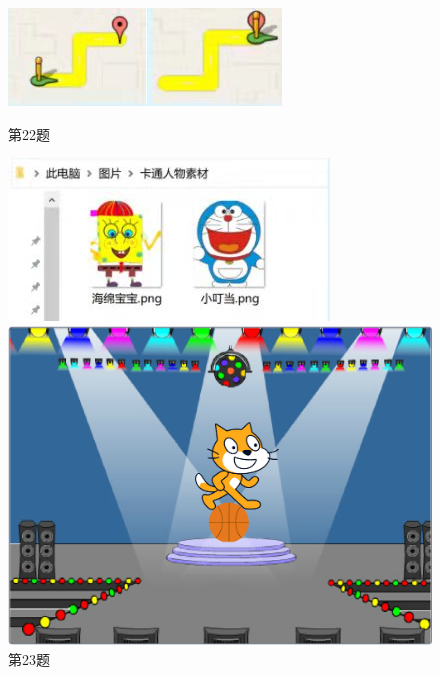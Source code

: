 \documentclass[10pt, a4paper]{article}
\begin{document}
\begin{enumerate}
        \begin{figure}[htbp]
            \centering
            \begin{minipage}[t]{.3\textwidth}
                \centering
                \includegraphics[width=\textwidth]{22.jpg}
                \caption*{第22题}
            \end{minipage}
            \begin{minipage}[t]{.25\textwidth}
                \centering
                \includegraphics[width=\textwidth]{23.jpg}
                \caption*{第23题}
            \end{minipage}
            \begin{minipage}[t]{.28\textwidth}
                \centering
                \begin{minipage}[t]{.6\textwidth}
                    \centering
                    \includegraphics[width=\textwidth]{25-1.png}

\end{minipage}
\end{minipage}
\end{figure}
\end{enumerate}
\end{document}
